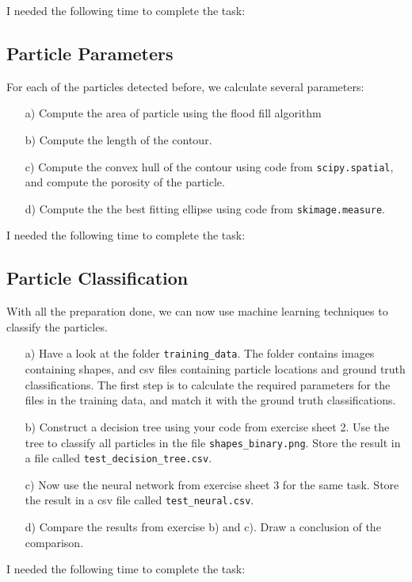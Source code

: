\documentclass{article}
\begin{document}
I needed the following time to complete the task:

\subsection{Particle Parameters}

For each of the particles detected before, we calculate several parameters:

\begin{enumerate}

\item[a)] Compute the area of particle using the flood fill algorithm

\item[b)] Compute the length of the contour.

\item[c)] Compute the convex hull of the contour using code from \texttt{scipy.spatial}, and compute the porosity of the particle.

\item[d)] Compute the the best fitting ellipse using code from \texttt{skimage.measure}.

\end{enumerate}

I needed the following time to complete the task:

\subsection{Particle Classification}

With all the preparation done, we can now use machine learning techniques to classify the particles. 

\begin{enumerate}

\item[a)] Have a look at the folder \texttt{training\_data}. The folder contains images containing shapes, and csv files containing particle locations and ground truth classifications.
The first step is to calculate the required parameters for the files in the training data, and match it with the ground truth classifications.

\item[b)] Construct a decision tree using your code from exercise sheet 2. Use the tree to classify all particles in the file \texttt{shapes\_binary.png}. Store the result in a file called \texttt{test\_decision\_tree.csv}.

\item[c)] Now use the neural network from exercise sheet 3 for the same task. Store the result in a csv file called \texttt{test\_neural.csv}. 

\item[d)] Compare the results from exercise b) and c). Draw a conclusion of the comparison.

\end{enumerate}

I needed the following time to complete the task:
\end{document}
